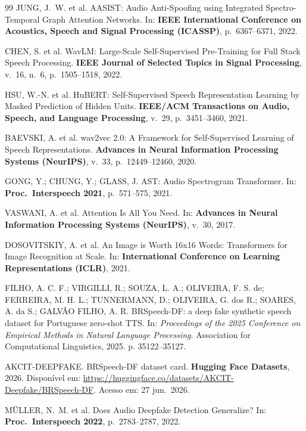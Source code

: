 \documentclass[12pt,a4paper]{article}
\begin{document}
\begin{thebibliography}{99}
	JUNG, J.~W. et al.
	AASIST: Audio Anti-Spoofing using Integrated Spectro-Temporal Graph Attention
	Networks.
	In: \textbf{IEEE International Conference on Acoustics, Speech and Signal
		Processing (ICASSP)}, p.~6367--6371, 2022.
	
	CHEN, S. et al.
	WavLM: Large-Scale Self-Supervised Pre-Training for Full Stack Speech
	Processing.
	\textbf{IEEE Journal of Selected Topics in Signal Processing},
	v.~16, n.~6, p.~1505--1518, 2022.
	
	HSU, W.-N. et al.
	HuBERT: Self-Supervised Speech Representation Learning by Masked Prediction
	of Hidden Units.
	\textbf{IEEE/ACM Transactions on Audio, Speech, and Language Processing},
	v.~29, p.~3451--3460, 2021.
	
	BAEVSKI, A. et al.
	wav2vec 2.0: A Framework for Self-Supervised Learning of Speech
	Representations.
	\textbf{Advances in Neural Information Processing Systems (NeurIPS)},
	v.~33, p.~12449--12460, 2020.
	
	GONG, Y.; CHUNG, Y.; GLASS, J.
	AST: Audio Spectrogram Transformer.
	In: \textbf{Proc.\ Interspeech 2021}, p.~571--575, 2021.
	
	VASWANI, A. et al.
	Attention Is All You Need.
	In: \textbf{Advances in Neural Information Processing Systems (NeurIPS)},
	v.~30, 2017.
	
	DOSOVITSKIY, A. et al.
	An Image is Worth 16x16 Words: Transformers for Image Recognition at Scale.
	In: \textbf{International Conference on Learning Representations (ICLR)}, 2021.
	
	FILHO, A. C. F.; VIRGILLI, R.; SOUZA, L. A.; OLIVEIRA, F. S. de;
	FERREIRA, M. H. L.; TUNNERMANN, D.; OLIVEIRA, G. dos R.; SOARES, A. da S.;
	GALVÃO FILHO, A. R.
	BRSpeech-DF: a deep fake synthetic speech dataset for Portuguese zero-shot TTS.
	In: \textit{Proceedings of the 2025 Conference on Empirical Methods in Natural
		Language Processing}. Association for Computational Linguistics, 2025.
	p. 35122--35127.
	
	AKCIT-DEEPFAKE.
	BRSpeech-DF dataset card.
	\textbf{Hugging Face Datasets}, 2026.
	Disponível em: \url{https://huggingface.co/datasets/AKCIT-Deepfake/BRSpeech-DF}.
	Acesso em: 27 jun.\ 2026.
	
	MÜLLER, N.~M. et al.
	Does Audio Deepfake Detection Generalize?
	In: \textbf{Proc.\ Interspeech 2022}, p.~2783--2787, 2022.
	

\end{thebibliography}
\end{document}
